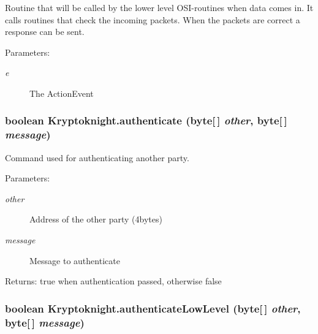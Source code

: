 Routine that will be called by the lower level OSI-routines when data comes in. It calls routines that check the incoming packets. When the packets are correct a response can be sent. \begin{Desc}
\item[Parameters:]
\begin{description}
\item[{\em e}]The Action\-Event \end{description}
\end{Desc}
\hypertarget{class_kryptoknight_c1}{
\subsubsection[authenticate]{\setlength{\rightskip}{0pt plus 5cm}boolean Kryptoknight.authenticate (byte\mbox{[}$\,$\mbox{]} {\em other}, byte\mbox{[}$\,$\mbox{]} {\em message})}}
\label{class_kryptoknight_c1}


Command used for authenticating another party. \begin{Desc}
\item[Parameters:]
\begin{description}
\item[{\em other}]Address of the other party (4bytes) \item[{\em message}]Message to authenticate \end{description}
\end{Desc}
\begin{Desc}
\item[Returns:]true when authentication passed, otherwise false \end{Desc}
\hypertarget{class_kryptoknight_c2}{
\subsubsection[authenticateLowLevel]{\setlength{\rightskip}{0pt plus 5cm}boolean Kryptoknight.authenticate\-Low\-Level (byte\mbox{[}$\,$\mbox{]} {\em other}, byte\mbox{[}$\,$\mbox{]} {\em message})}}
\label{class_kryptoknight_c2}


